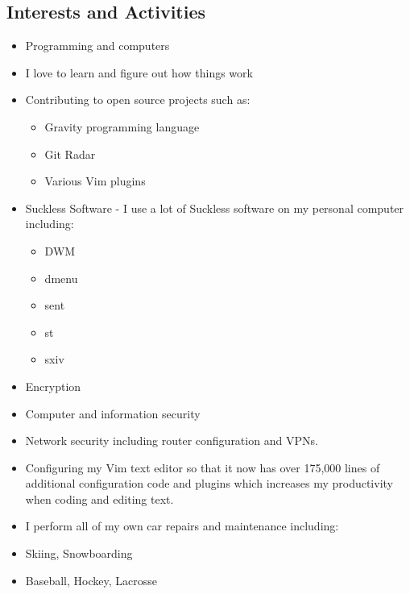 \documentclass[]{friggeri-cv} %
\begin{document}
\begin{entrylist}

\section{Interests and Activities}

\interest
{
\begin{itemize}
\item Programming and computers
\item I love to learn and figure out how things work
\item Contributing to open source projects such as:
  \begin{itemize}
    \item Gravity programming language
    \item Git Radar
    \item Various Vim plugins
  \end{itemize}
\item Suckless Software - I use a lot of Suckless software on my personal
 computer including:
  \begin{itemize}
    \item DWM
    \item dmenu
    \item sent
    \item st
    \item sxiv
  \end{itemize}
\item Encryption
\item Computer and information security
\item Network security including router configuration and VPNs.
\item Configuring my Vim text editor so that it now has over 175,000 lines of
additional configuration code and plugins which increases my productivity when
coding and editing text.
\item I perform all of my own car repairs and maintenance including:
\item Skiing, Snowboarding
\item Baseball, Hockey, Lacrosse
\end{itemize}
}
\end{entrylist}
\end{document}
